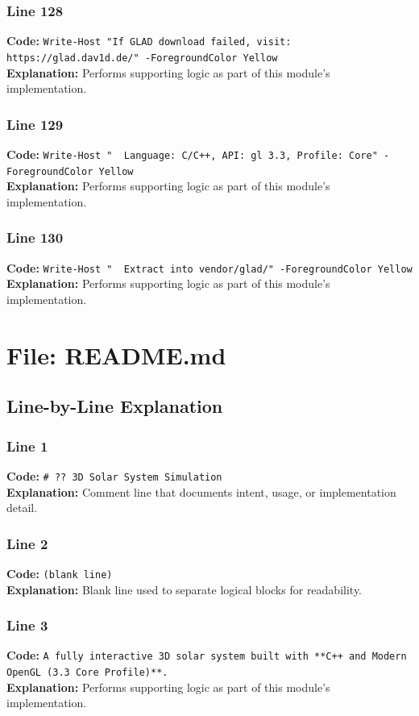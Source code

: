 \documentclass[11pt,a4paper]{article}
\begin{document}
\subsubsection*{Line 128}
\textbf{Code:} \verb|Write-Host "If GLAD download failed, visit: https://glad.dav1d.de/" -ForegroundColor Yellow|\\
\textbf{Explanation:} Performs supporting logic as part of this module's implementation.

\subsubsection*{Line 129}
\textbf{Code:} \verb|Write-Host "  Language: C/C++, API: gl 3.3, Profile: Core" -ForegroundColor Yellow|\\
\textbf{Explanation:} Performs supporting logic as part of this module's implementation.

\subsubsection*{Line 130}
\textbf{Code:} \verb|Write-Host "  Extract into vendor/glad/" -ForegroundColor Yellow|\\
\textbf{Explanation:} Performs supporting logic as part of this module's implementation.

\newpage
\section{File: README.md}
\subsection{Line-by-Line Explanation}
\subsubsection*{Line 1}
\textbf{Code:} \verb|# ?? 3D Solar System Simulation|\\
\textbf{Explanation:} Comment line that documents intent, usage, or implementation detail.

\subsubsection*{Line 2}
\textbf{Code:} \texttt{(blank line)}\\
\textbf{Explanation:} Blank line used to separate logical blocks for readability.

\subsubsection*{Line 3}
\textbf{Code:} \verb|A fully interactive 3D solar system built with **C++ and Modern OpenGL (3.3 Core Profile)**.|\\
\textbf{Explanation:} Performs supporting logic as part of this module's implementation.
\end{document}

